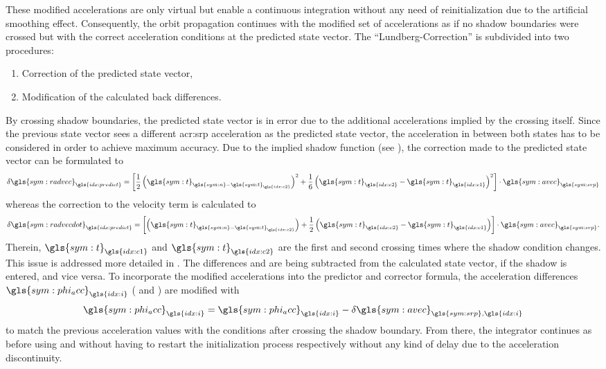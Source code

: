  These modified accelerations are only virtual but enable a continuous integration without any need of reinitialization due to the artificial smoothing effect. Consequently, the orbit propagation continues with the modified set of accelerations as if no shadow boundaries were crossed but with the correct acceleration conditions at the predicted state vector. The ``Lundberg-Correction'' is subdivided into two procedures:
 \begin{enumerate}
  \item Correction of the predicted state vector,
  \item Modification of the calculated back differences.
 \end{enumerate}
By crossing shadow boundaries, the predicted state vector is in error due to the additional accelerations implied by the crossing itself. Since the previous state vector sees a different \gls{acr:srp} acceleration as the predicted state vector, the acceleration in between both states has to be considered in order to achieve maximum accuracy. Due to the implied shadow function (see ), the correction made to the predicted state vector can be formulated to
\begin{equation}
 \delta \gls{sym:radvec}_{\gls{idx:predict}} = \left[\frac{1}{2}\left(\gls{sym:t}_{\gls{sym:n}-\gls{sym:t}_{\gls{idx:c2}}}\right)^{2}+\frac{1}{6}\left(\gls{sym:t}_{\gls{idx:c2}}-\gls{sym:t}_{\gls{idx:c1}}\right)^{2}\right] \cdot \gls{sym:avec}_{\gls{sym:srp}}
 \label{equ:statecorrection}
\end{equation}
whereas the correction to the velocity term is calculated to
\begin{equation}
 \delta \gls{sym:radvecdot}_{\gls{idx:predict}} = \left[\left(\gls{sym:t}_{\gls{sym:n}-\gls{sym:t}_{\gls{idx:c2}}}\right)+\frac{1}{2}\left(\gls{sym:t}_{\gls{idx:c2}}-\gls{sym:t}_{\gls{idx:c1}}\right)\right] \cdot \gls{sym:avec}_{\gls{sym:srp}}.
 \label{equ:velocitycorrection}
\end{equation}
Therein, $\gls{sym:t}_{\gls{idx:c1}}$ and $\gls{sym:t}_{\gls{idx:c2}}$ are the first and second crossing times where the shadow condition changes. This issue is addressed more
detailed in . The differences  and  are being subtracted from the calculated state vector,
if the shadow is entered, and vice versa. To incorporate the modified accelerations into the predictor and corrector formula, the acceleration differences
$\gls{sym:phi_acc}_{\gls{idx:i}}$ ( and ) are modified with
\begin{equation}
 \gls{sym:phi_acc}_{\gls{idx:i}} = \gls{sym:phi_acc}_{\gls{idx:i}} - \delta \gls{sym:avec}_{\gls{sym:srp},\gls{idx:i}}
\end{equation}
to match the previous acceleration values with the conditions after crossing the shadow boundary. From there, the integrator continues as before using  and  without having to restart the initialization process respectively without any kind of delay due to the acceleration discontinuity. 

